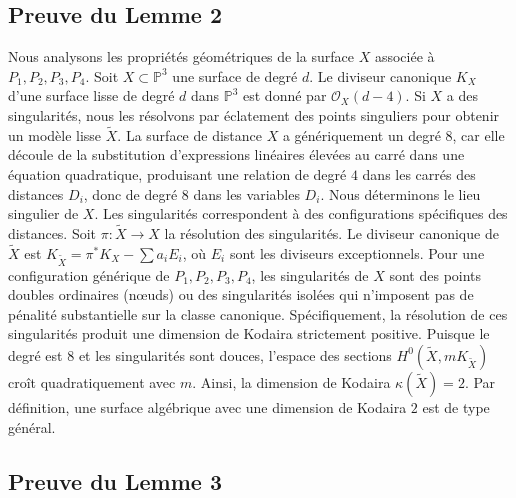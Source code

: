 \documentclass[12pt,a4paper]{article}
\begin{document}
\subsection{Preuve du Lemme 2}

Nous analysons les propri\'et\'es g\'eom\'etriques de la surface $X$ associ\'ee \`a $P_1, P_2, P_3, P_4$.
Soit $X \subset \mathbb{P}^3$ une surface de degr\'e $d$. Le diviseur canonique $K_X$ d'une surface lisse de degr\'e $d$ dans $\mathbb{P}^3$ est donn\'e par $\mathcal{O}_X(d - 4)$. Si $X$ a des singularit\'es, nous les r\'esolvons par \'eclatement des points singuliers pour obtenir un mod\`ele lisse $\tilde{X}$.
La surface de distance $X$ a g\'en\'eriquement un degr\'e $8$, car elle d\'ecoule de la substitution d'expressions lin\'eaires \'elev\'ees au carr\'e dans une \'equation quadratique, produisant une relation de degr\'e $4$ dans les carr\'es des distances $D_i$, donc de degr\'e $8$ dans les variables $D_i$.
Nous d\'eterminons le lieu singulier de $X$. Les singularit\'es correspondent \`a des configurations sp\'ecifiques des distances. Soit $\pi: \tilde{X} \to X$ la r\'esolution des singularit\'es. Le diviseur canonique de $\tilde{X}$ est $K_{\tilde{X}} = \pi^* K_X - \sum a_i E_i$, o\`u $E_i$ sont les diviseurs exceptionnels.
Pour une configuration g\'en\'erique de $P_1, P_2, P_3, P_4$, les singularit\'es de $X$ sont des points doubles ordinaires (n\oe uds) ou des singularit\'es isol\'ees qui n'imposent pas de p\'enalit\'e substantielle sur la classe canonique. Sp\'ecifiquement, la r\'esolution de ces singularit\'es produit une dimension de Kodaira strictement positive.
Puisque le degr\'e est $8$ et les singularit\'es sont douces, l'espace des sections $H^0(\tilde{X}, mK_{\tilde{X}})$ cro\^it quadratiquement avec $m$. Ainsi, la dimension de Kodaira $\kappa(\tilde{X}) = 2$. Par d\'efinition, une surface alg\'ebrique avec une dimension de Kodaira $2$ est de type g\'en\'eral.

\subsection{Preuve du Lemme 3}
\end{document}
